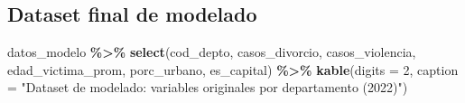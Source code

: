 \documentclass[
]{article}
\newenvironment{Shaded}{\begin{snugshade}}{\end{snugshade}}
\newcommand{\AttributeTok}[1]{\textcolor[rgb]{0.13,0.29,0.53}{#1}}
\newcommand{\DecValTok}[1]{\textcolor[rgb]{0.00,0.00,0.81}{#1}}
\newcommand{\FunctionTok}[1]{\textcolor[rgb]{0.13,0.29,0.53}{\textbf{#1}}}
\newcommand{\NormalTok}[1]{#1}
\newcommand{\SpecialCharTok}[1]{\textcolor[rgb]{0.81,0.36,0.00}{\textbf{#1}}}
\newcommand{\StringTok}[1]{\textcolor[rgb]{0.31,0.60,0.02}{#1}}
\begin{document}
\hypertarget{dataset-final-de-modelado}{%
\subsection{Dataset final de modelado}\label{dataset-final-de-modelado}}

\begin{Shaded}
\begin{Highlighting}[]
\NormalTok{datos\_modelo }\SpecialCharTok{\%\textgreater{}\%}
  \FunctionTok{select}\NormalTok{(cod\_depto, casos\_divorcio, casos\_violencia,}
\NormalTok{         edad\_victima\_prom, porc\_urbano, es\_capital) }\SpecialCharTok{\%\textgreater{}\%}
  \FunctionTok{kable}\NormalTok{(}\AttributeTok{digits =} \DecValTok{2}\NormalTok{,}
        \AttributeTok{caption =} \StringTok{"Dataset de modelado: variables originales por departamento (2022)"}\NormalTok{)}
\end{Highlighting}
\end{Shaded}
\end{document}
